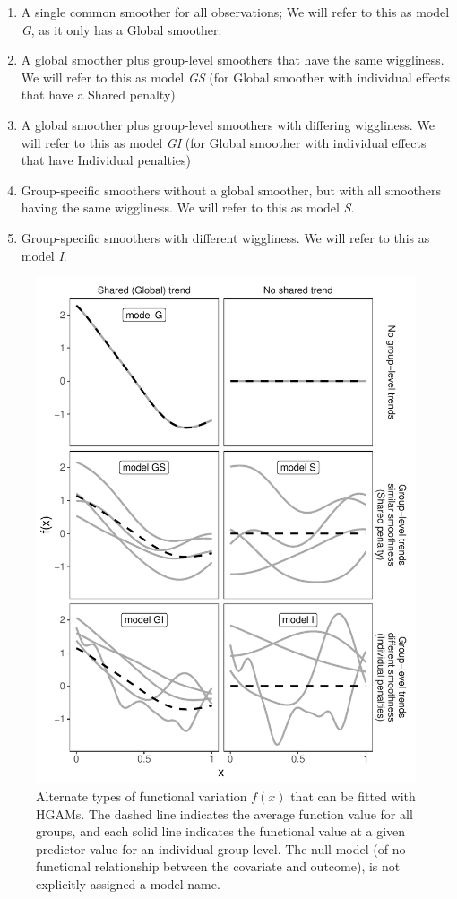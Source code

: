 \documentclass[12pt]{article}
\providecommand{\tightlist}{%
  \setlength{\itemsep}{0pt}\setlength{\parskip}{0pt}}
\begin{document}
\begin{enumerate}
\def\labelenumi{\arabic{enumi}.}
\tightlist
\item
  A single common smoother for all observations; We will refer to this
  as model \emph{G}, as it only has a Global smoother.
\item
  A global smoother plus group-level smoothers that have the same
  wiggliness. We will refer to this as model \emph{GS} (for Global
  smoother with individual effects that have a Shared penalty)
\item
  A global smoother plus group-level smoothers with differing
  wiggliness. We will refer to this as model \emph{GI} (for Global
  smoother with individual effects that have Individual penalties)
\item
  Group-specific smoothers without a global smoother, but with all
  smoothers having the same wiggliness. We will refer to this as model
  \emph{S}.
\item
  Group-specific smoothers with different wiggliness. We will refer to
  this as model \emph{I}.
\end{enumerate}

\begin{figure}
\centering
\includegraphics{../figures/Fig4.pdf}
\caption{\label{fig:models}Alternate types of functional variation
\(f(x)\) that can be fitted with HGAMs. The dashed line indicates the
average function value for all groups, and each solid line indicates the
functional value at a given predictor value for an individual group
level. The null model (of no functional relationship between the
covariate and outcome), is not explicitly assigned a model name.}
\end{figure}
\end{document}
